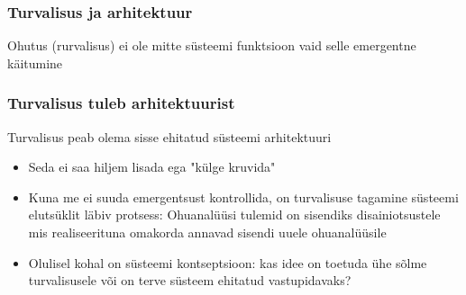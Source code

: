 \begin{frame}[fragile]
  \frametitle{Turvalisus ja arhitektuur}
	\begin{center}
		Ohutus (rurvalisus) ei ole mitte süsteemi funktsioon vaid selle emergentne käitumine
	\end{center}
	\cite{leveson2011engineering}
\end{frame}

\begin{frame}[fragile]
  \frametitle{Turvalisus tuleb arhitektuurist}
	Turvalisus peab olema sisse ehitatud süsteemi arhitektuuri
	\begin{itemize}
		\item Seda ei saa hiljem lisada ega "külge kruvida"
		\item Kuna me ei suuda emergentsust kontrollida, on turvalisuse tagamine süsteemi elutsüklit läbiv protsess: Ohuanalüüsi tulemid on sisendiks disainiotsustele mis realiseerituna omakorda annavad sisendi uuele ohuanalüüsile
		\item Olulisel kohal on süsteemi kontseptsioon: kas idee on toetuda ühe sõlme turvalisusele või on terve süsteem ehitatud vastupidavaks?
	\end{itemize}
\end{frame}

